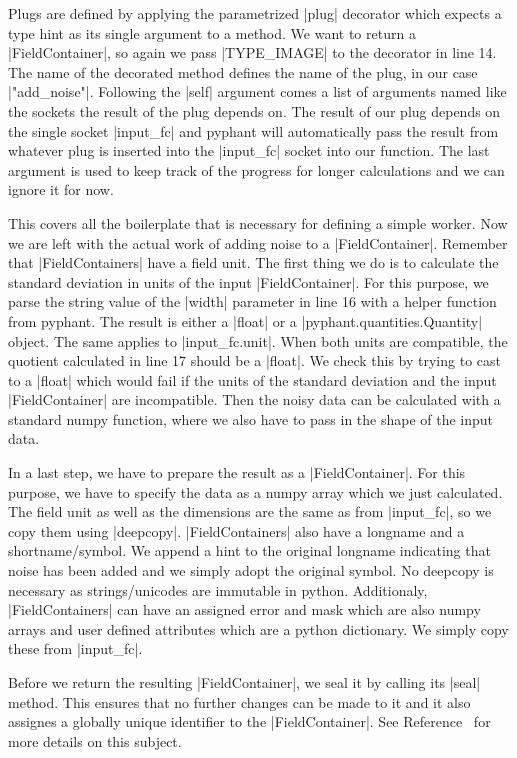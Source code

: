 \documentclass[a4paper]{article}
\begin{document}
Plugs are defined by applying the parametrized |plug| decorator which
expects a type hint as its single argument to a method. We want to
return a |FieldContainer|, so again we pass |TYPE_IMAGE| to the
decorator in line 14. The name of the decorated method defines the
name of the plug, in our case |"add_noise"|. Following the |self|
argument comes a list of arguments named like the sockets the result
of the plug depends on. The result of our plug depends on the single
socket |input_fc| and pyphant will automatically pass the result from
whatever plug is inserted into the |input_fc| socket into our
function. The last argument is used to keep track of the progress for
longer calculations and we can ignore it for now.

This covers all the boilerplate that is necessary for defining a
simple worker. Now we are left with the actual work of adding noise to
a |FieldContainer|. Remember that |FieldContainers| have a field
unit. The first thing we do is to calculate the standard deviation in
units of the input |FieldContainer|. For this purpose, we parse the
string value of the |width| parameter in line 16 with a helper
function from pyphant. The result is either a |float| or a
|pyphant.quantities.Quantity| object. The same applies to
|input_fc.unit|. When both units are compatible, the quotient
calculated in line 17 should be a |float|. We check this by trying to
cast to a |float| which would fail if the units of the standard
deviation and the input |FieldContainer| are incompatible. Then the
noisy data can be calculated with a standard numpy function, where we
also have to pass in the shape of the input data.

In a last step, we have to prepare the result as a
|FieldContainer|. For this purpose, we have to specify the data as a
numpy array which we just calculated. The field unit as well as the
dimensions are the same as from |input_fc|, so we copy them using
|deepcopy|. |FieldContainers| also have a longname and a
shortname/symbol. We append a hint to the original longname indicating
that noise has been added and we simply adopt the original symbol. No
deepcopy is necessary as strings/unicodes are immutable in
python. Additionaly, |FieldContainers| can have an assigned error and
mask which are also numpy arrays and user defined attributes which are
a python dictionary. We simply copy these from |input_fc|.

Before we return the resulting |FieldContainer|, we seal it by calling
its |seal| method. This ensures that no further changes can be made to
it and it also assignes a globally unique identifier to the
|FieldContainer|. See Reference~\cite{pyphant} for more details on
this subject.
\end{document}

